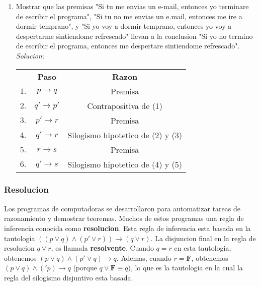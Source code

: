 \documentclass[]{article}
\begin{document}
\begin{enumerate}
	\item Mostrar que las premisas "Si tu me envias un e-mail, entonces yo terminare de escribir el programa", "Si tu no me envias un e.mail, entonces me ire a dormir temprano", y "Si yo voy a dormir temprano, entonces yo voy a despertarme sintiendome refrescado" llevan a la conclusion "Si yo no termino de escribir el programa, entonces me despertare sintiendome refrescado".
	\textit{Solucion:}
	\begin{table}[H]
		\begin{center}
			\begin{tabular}{ c c c }
				& \textbf{Paso} & \textbf{Razon}\\
				$1.$ & $p \rightarrow q$ & Premisa\\
				$2.$ & $q' \rightarrow p'$ & Contrapositiva de (1)\\
				$3.$ & $p' \rightarrow r$ & Premisa\\
				$4.$ & $q' \rightarrow r$ & Silogismo hipotetico de (2) y (3)\\
				$5.$ & $r \rightarrow s$ & Premisa\\
				$6.$ & $q' \rightarrow s$ & Silogismo hipotetico de (4) y (5)
			\end{tabular}
		\end{center}
	\end{table}
\end{enumerate}

\subsubsection*{Resolucion}

Los programas de computadoras se desarrollaron para automatizar tareas de razonamiento y demostrar teoremas. Muchos de estos programas una regla de inferencia conocida como \textbf{resolucion}. Esta regla de inferencia esta basada en la tautologia $((p \vee q) \wedge (p' \vee r)) \rightarrow (q \vee r)$. La disjuncion final en la regla de resolucion $q \vee r$, es llamada \textbf{resolvente}. Cuando $q = r$ en esta tautologia, obtenemos $(p \vee q) \wedge (p' \vee q) \rightarrow q$. Ademas, cuando $r = \textbf{F}$, obtenemos $(p \vee q) \wedge ('p) \rightarrow q$ (porque $q \vee \textbf{F} \equiv q)$, lo que es la tautologia en la cual la regla del silogismo disjuntivo esta basada.
\end{document}
